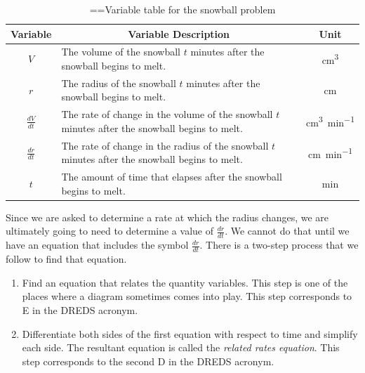 \documentclass[10pt,oneside,]{book}
\newcommand{\acronym}[1]{#1}
\theoremstyle{plain}
\theoremstyle{definition}
\numberwithin{equation}{section}
\newcommand{\lz}[2]{\frac{d#1}{d#2}}
\begin{document}
\begin{table}
\centering
\caption{\binoppenalty=\maxdimen \relpenalty=\maxdimen Variable table for the snowball problem\label{table-snowball}}
\begin{tabular}{cp{3.5in}c}
\toprule
Variable&\multicolumn{1}{c}{Variable Description}&Unit\\
\midrule
\(V\)&The volume of the snowball \(t\) minutes after the snowball begins to melt.&\si{\centi\meter\tothe{3}}\\
\midrule
\(r\)&The radius of the snowball \(t\) minutes after the snowball begins to melt.&\si{\centi\meter}\\
\midrule
\(\lz{V}{t}\)&The rate of change in the volume of the snowball \(t\) minutes after the snowball begins to melt.&\si{\centi\meter\tothe{3}\per\minute}\\
\midrule
\(\lz{r}{t}\)&The rate of change in the radius of the snowball \(t\) minutes after the snowball begins to melt.&\si{\centi\meter\per\minute}\\
\midrule
\(t\)&The amount of time that elapses after the snowball begins to melt.&\si{\minute}\\
\bottomrule
\end{tabular}
\end{table}
\par
Since we are asked to determine a rate at which the radius changes, we are ultimately going to need to determine a value of \(\lz{r}{t}\). We cannot do that until we have an equation that includes the symbol \(\lz{r}{t}\). There is a two-step process that we follow to find that equation.%
\begin{enumerate}
\item{}Find an equation that relates the quantity variables. This step is one of the places where a diagram sometimes comes into play. This step corresponds to \acronym{E} in the \acronym{DREDS} acronym.\item{}Differentiate both sides of the first equation with respect to time and simplify each side. The resultant equation is called the \emph{related rates equation}. This step corresponds to the second \acronym{D} in the \acronym{DREDS} acronym.\end{enumerate}
\par
\end{document}

